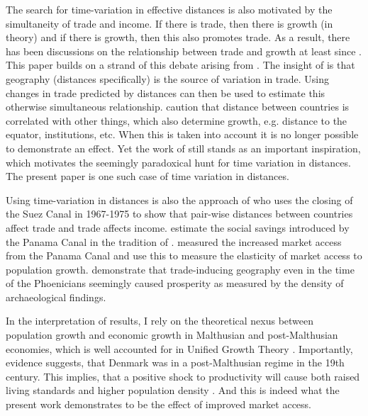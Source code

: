 \documentclass[11pt]{article}
\begin{document}
The search for time-variation in effective distances is also motivated by the simultaneity of trade and income. If there is trade, then there is growth (in theory) and if there is growth, then this also promotes trade. As a result, there has been discussions on the relationship between trade and growth at least since \cite{ricardo1817principles}. This paper builds on a strand of this debate arising from \cite{Frankel1999}. The insight of \cite{Frankel1999} is that geography (distances specifically) is the source of variation in trade. Using changes in trade predicted by distances can then be used to estimate this otherwise simultaneous relationship. \cite{Rodriguez2001} caution that distance between countries is correlated with other things, which also determine growth, e.g. distance to the equator, institutions, etc. When this is taken into account it is no longer possible to demonstrate an effect. Yet the work of \cite{Frankel1999} still stands as an important inspiration, which motivates the seemingly paradoxical hunt for time variation in distances. The present paper is one such case of time variation in distances.

Using time-variation in distances is also the approach of \cite{Feyrer2021} who uses the closing of the Suez Canal in 1967-1975 to show that pair-wise distances between countries affect trade and trade affects income. \cite{Maurer2008} estimate the social savings introduced by the Panama Canal in the tradition of \cite{Fogel1964}. \cite{rauch2022a} measured the increased market access from the Panama Canal and use this to measure the elasticity of market access to population growth. \cite{Bakker2021Phonecians} demonstrate that trade-inducing geography even in the time of the Phoenicians seemingly caused prosperity as measured by the density of archaeological findings. 

In the interpretation of results, I rely on the theoretical nexus between population growth and economic growth in Malthusian and post-Malthusian economies, which is well accounted for in Unified Growth Theory \citep{Galor2005, Galor2011}. Importantly, evidence suggests, that Denmark was in a post-Malthusian regime in the 19th century. This implies, that a positive shock to productivity will cause both raised living standards and higher population density \citep{Jensen2022, Klemp2016}. And this is indeed what the present work demonstrates to be the effect of improved market access. 
\end{document}
